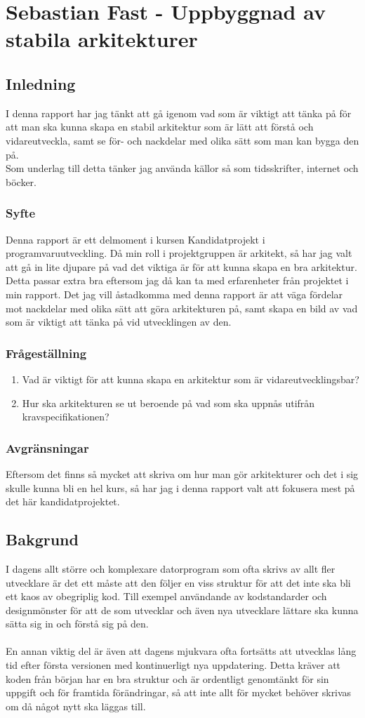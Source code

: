 \section{Sebastian Fast - Uppbyggnad av stabila arkitekturer}
\subsection{Inledning}
I denna rapport har jag tänkt att gå igenom vad som är viktigt att tänka på för att man ska kunna skapa en stabil arkitektur som är lätt att förstå och vidareutveckla, samt se för- och nackdelar med olika sätt som man kan bygga den på.
\\
Som underlag till detta tänker jag använda källor så som tidsskrifter, internet och böcker.   
\subsubsection{Syfte}
Denna rapport är ett delmoment i kursen Kandidatprojekt i programvaruutveckling. Då min roll i projektgruppen är arkitekt, så har jag valt att gå in lite djupare på vad det viktiga är för att kunna skapa en bra arkitektur. Detta passar extra bra eftersom jag då kan ta med erfarenheter från projektet i min rapport.
Det jag vill åstadkomma med denna rapport är att väga fördelar mot nackdelar med olika sätt att göra arkitekturen på, samt skapa en bild av vad som är viktigt att tänka på vid utvecklingen av den.
\subsubsection{Frågeställning}
\begin{enumerate}
	\item Vad är viktigt för att kunna skapa en arkitektur som är vidareutvecklingsbar?
	\item Hur ska arkitekturen se ut beroende på vad som ska uppnås utifrån kravspecifikationen?
\end{enumerate}
\subsubsection{Avgränsningar}
Eftersom det finns så mycket att skriva om hur man gör arkitekturer och det i sig skulle kunna bli en hel kurs, så har jag i denna rapport valt att fokusera mest på det här kandidatprojektet.
\subsection{Bakgrund}
I dagens allt större och komplexare datorprogram som ofta skrivs av allt fler utvecklare är det ett måste att den följer en viss struktur för att det inte ska bli ett kaos av obegriplig kod. Till exempel användande av kodstandarder och designmönster för att de som utvecklar och även nya utvecklare lättare ska kunna sätta sig in och förstå sig på den.
\\\\
En annan viktig del är även att dagens mjukvara ofta fortsätts att utvecklas lång tid efter första versionen med kontinuerligt nya uppdatering. Detta kräver att koden från början har en bra struktur och är ordentligt genomtänkt för sin uppgift och för framtida förändringar, så att inte allt för mycket behöver skrivas om då något nytt ska läggas till.
